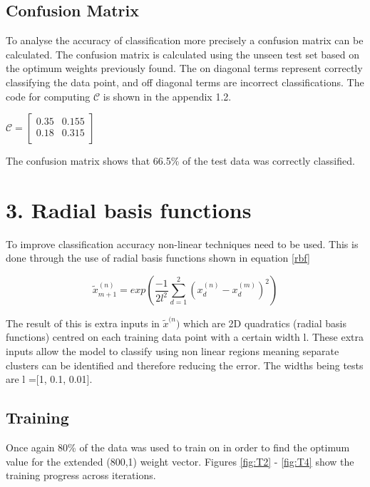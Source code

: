 \documentclass[twoside,twocolumn]{article}
\begin{document}
\subsection{Confusion Matrix}
To analyse the accuracy of classification more precisely a confusion matrix can be calculated. The confusion matrix is calculated using the unseen test set based on the optimum weights previously found. The on diagonal terms represent correctly classifying the data point, and off diagonal terms are incorrect classifications. The code for computing $\mathcal{C}$ is shown in the appendix 1.2.
\newline 

\begin{center}
$\mathcal{C}=  
\begin{bmatrix}
    0.35 & 0.155  \\
    0.18 & 0.315 \\
\end{bmatrix}$
\newline
\end{center}

The confusion matrix shows that 66.5\% of the test data was correctly classified.


\section{3. Radial basis functions}
To improve classification accuracy non-linear techniques need to be used. This is done through the use of radial basis functions shown in equation \ref{rbf}

\begin{equation}
\label{rbf}
\tilde{x}_{m+1}^{(n)} = exp (\frac{-1}{2l^2}\sum^2_{d=1} (x_d^{(n)} - x_d^{(m)})^2)
\end{equation}

 The result of this is extra inputs in $\tilde{x}^{(n})$ which are 2D quadratics (radial basis functions) centred on each training data point with a certain width l. These extra inputs allow the model to classify using non linear regions meaning separate clusters can be identified and therefore reducing the error. The widths being tests are l =[1, 0.1, 0.01].
\subsection{Training}
Once again 80\% of the data was used to train on in order to find the optimum value for the extended (800,1) weight vector. Figures \ref{fig:T2} - \ref{fig:T4} show the training progress across iterations. 
\end{document}
